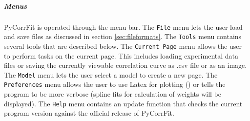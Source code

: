 \subparagraph*{Menus} PyCorrFit is operated through the menu bar. The \texttt{File} menu lets the user load and save files as discussed in section \ref{sec:fileformats}. The \texttt{Tools} menu contains several tools that are described below. The \texttt{Current Page} menu allows the user to perform tasks on the current page. This includes loading experimental data files or saving the currently viewable correlation curve as \mytilde .csv file or as an image. The \texttt{Model} menu lets the user select a model to create a new page. The \texttt{Preferences} menu allows the user to use Latex for plotting () or tells the program to be more verbose (spline fits for calculation of weights will be displayed). The \texttt{Help} menu contains an update function that checks the current program version against the official release of PyCorrFit.

